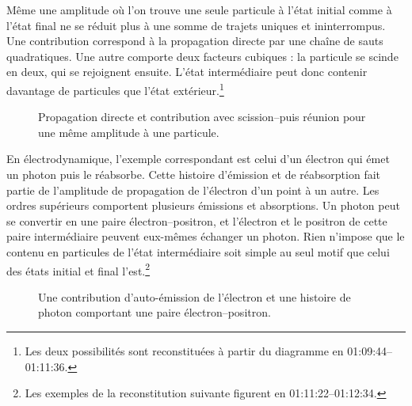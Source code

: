 Même une amplitude où l’on trouve une seule particule à l’état initial comme à l’état final ne se réduit plus à une somme de trajets uniques et ininterrompus. Une contribution correspond à la propagation directe par une chaîne de sauts quadratiques. Une autre comporte deux facteurs cubiques : la particule se scinde en deux, qui se rejoignent ensuite. L’état intermédiaire peut donc contenir davantage de particules que l’état extérieur.\footnote{Les deux possibilités sont reconstituées à partir du diagramme en 01:09:44--01:11:36.}

\begin{figure}[htbp]
\centering
{}
\caption{Propagation directe et contribution avec scission--puis réunion pour une même amplitude à une particule.}
\end{figure}

En électrodynamique, l’exemple correspondant est celui d’un électron qui émet un photon puis le réabsorbe. Cette histoire d’émission et de réabsorption fait partie de l’amplitude de propagation de l’électron d’un point à un autre. Les ordres supérieurs comportent plusieurs émissions et absorptions. Un photon peut se convertir en une paire électron--positron, et l’électron et le positron de cette paire intermédiaire peuvent eux-mêmes échanger un photon. Rien n’impose que le contenu en particules de l’état intermédiaire soit simple au seul motif que celui des états initial et final l’est.\footnote{Les exemples de la reconstitution suivante figurent en 01:11:22--01:12:34.}

\begin{figure}[htbp]
\centering
{}
\caption{Une contribution d’auto-émission de l’électron et une histoire de photon comportant une paire électron--positron.}
\end{figure}

